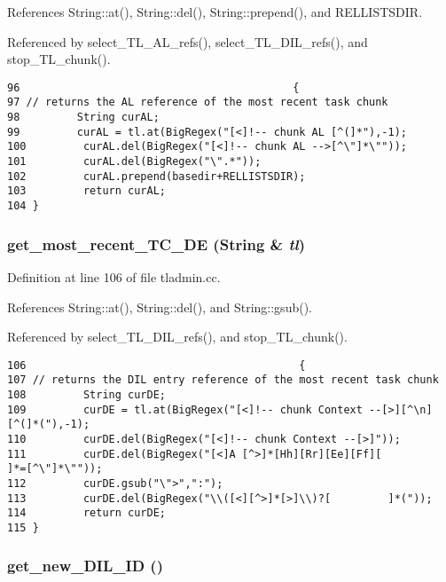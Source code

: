 References String::at(), String::del(), String::prepend(), and RELLISTSDIR.

Referenced by select\_\-TL\_\-AL\_\-refs(), select\_\-TL\_\-DIL\_\-refs(), and stop\_\-TL\_\-chunk().



\footnotesize\begin{verbatim}96                                           {
97 // returns the AL reference of the most recent task chunk
98         String curAL;
99         curAL = tl.at(BigRegex("[<]!-- chunk AL [^(]*"),-1);
100         curAL.del(BigRegex("[<]!-- chunk AL -->[^\"]*\""));
101         curAL.del(BigRegex("\".*"));
102         curAL.prepend(basedir+RELLISTSDIR);
103         return curAL;
104 }
\end{verbatim}\normalsize 
{}
\subsubsection{ get\_\-most\_\-recent\_\-TC\_\-DE ({\bf String} \& {\em tl})}\label{dil2al_8hh_a321}




Definition at line 106 of file tladmin.cc.

References String::at(), String::del(), and String::gsub().

Referenced by select\_\-TL\_\-DIL\_\-refs(), and stop\_\-TL\_\-chunk().



\footnotesize\begin{verbatim}106                                           {
107 // returns the DIL entry reference of the most recent task chunk
108         String curDE;
109         curDE = tl.at(BigRegex("[<]!-- chunk Context --[>][^\n][^(]*("),-1);
110         curDE.del(BigRegex("[<]!-- chunk Context --[>]"));
111         curDE.del(BigRegex("[<]A [^>]*[Hh][Rr][Ee][Ff][         ]*=[^\"]*\""));
112         curDE.gsub("\">",":");
113         curDE.del(BigRegex("\\([<][^>]*[>]\\)?[         ]*("));
114         return curDE;
115 }
\end{verbatim}\normalsize 
{}
\subsubsection{ get\_\-new\_\-DIL\_\-ID ()}\label{dil2al_8hh_a301}




